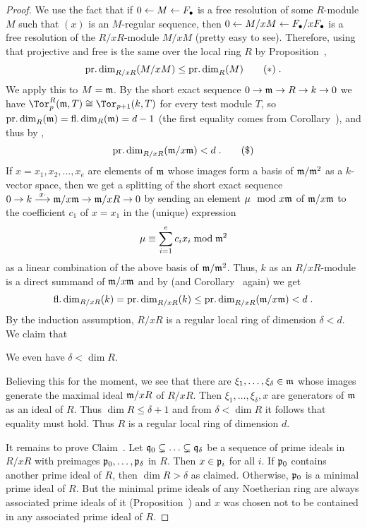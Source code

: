 \documentclass[a4paper,parskip=half,numbers=enddot, DIV=12]{scrreprt}
\begin{document}
\begin{proof}
	We use the fact that if $0\lmorphism M\lmorphism F_\bullet$ is a free resolution of some $R$-module $M$ such that $(x)$ is an $M$-regular sequence, then $0\lmorphism M/xM\lmorphism F_\bullet/xF_\bullet$ is a free resolution of the $R/xR$-module $M/xM$ (pretty easy to see). Therefore, using that projective and free is the same over the local ring $R$ by Proposition~,
	\begin{align}\lbl{eq:pdimOfM/xMandM}
		\pdim_{R/xR}(M/xM)\leq \pdim_R(M)\tag{$*$}\;.
	\end{align}
	We apply this to $M=\mathfrak{m}$. By the short exact sequence $0\morphism\mm\morphism R\morphism k\morphism 0$ we have $\Tor_p^R(\mm,T)\cong\Tor_{p+1}(k,T)$ for every test module $T$, so $\operatorname{pr.dim}_R(\mathfrak{m})=\operatorname{fl.dim}_R(\mathfrak{m})=d-1$ (the first equality comes from Corollary~), and thus by ,
	\begin{align}\lbl{eq:pdimIneq2}
		\pdim_{R/xR}(\mm/x\mm)<d\;.\tag{\$}
	\end{align}
	If $x=x_1,x_2,\ldots,x_e$ are elements of $\mathfrak{m}$ whose images form a basis of $\mathfrak{m}/\mathfrak{m}^2$ as a $k$-vector space, then we get a splitting of the short exact sequence $0\morphism k\morphism[x\cdot ]\mm/x\mm\morphism\mm/xR\morphism 0$
	by sending an element $\mu\mod x\mathfrak{m}$ of $\mathfrak{m}/x\mathfrak{m}$ to the coefficient $c_1$ of $x=x_1$ in the (unique) expression
	\begin{align*}
		\mu\equiv\sum_{i=1}^ec_ix_i\bmod\mathfrak{m}^2
	\end{align*}
	as a linear combination of the above basis of $\mathfrak{m}/\mathfrak{m}^2$. Thus, $k$ as an $R/xR$-module is a direct summand of $\mathfrak{m}/x\mathfrak{m}$ and by  (and Corollary~ again) we get
	\begin{align*}
		\operatorname{fl.dim}_{R/xR}(k)= \operatorname{pr.dim}_{R/xR}(k)\leq \operatorname{pr.dim}_{R/xR}(\mathfrak{m}/x\mathfrak{m})<d\;.
	\end{align*}
	By the induction assumption, $R/xR$ is a regular local ring of dimension $\delta<d$. We claim that
	\begin{claim}
		We even have $\delta<\dim R$.
	\end{claim}
	Believing this for the moment, we see that there are $\xi_1,\ldots,\xi_\delta\in\mathfrak{m}$ whose images generate the maximal ideal $\mathfrak{m}/xR$ of $R/xR$. Then $\xi_1,\ldots,\xi_\delta,x$ are generators of $\mathfrak{m}$ as an ideal of $R$. Thus $\dim R\leq \delta+1$ and from $\delta<\dim R$ it follows that equality must hold. Thus $R$ is a regular local ring of dimension $d$.
	
	It remains to prove Claim~. Let $\mathfrak{q}_0\subsetneq\ldots\subsetneq\mathfrak{q}_\delta$ be a sequence of prime ideals in $R/xR$ with preimages $\mathfrak{p}_0,\ldots,\mathfrak{p}_\delta$ in $R$. Then $x\in\mathfrak{p}_i$ for all $i$. If $\mathfrak{p}_0$ contains another prime ideal of $R$, then $\dim R>\delta$ as claimed. Otherwise, $\mathfrak{p}_0$ is a minimal prime ideal of $R$. But the minimal prime ideals of any Noetherian ring are always associated prime ideals of it (Proposition~) and $x$ was chosen not to be contained in any associated prime ideal of $R$.
\end{proof}
\end{document}
